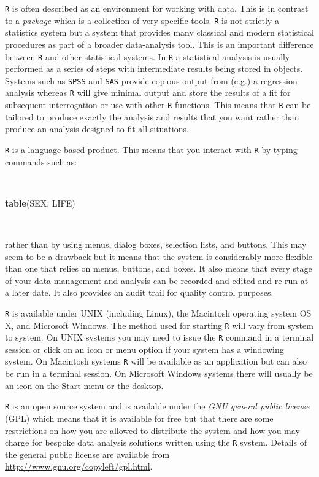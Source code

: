 \documentclass[12pt,a4paper]{book}
\newenvironment{Shaded}{\begin{snugshade}}{\end{snugshade}}
\newcommand{\KeywordTok}[1]{\textcolor[rgb]{0.13,0.29,0.53}{\textbf{#1}}}
\newcommand{\NormalTok}[1]{#1}
\theoremstyle{definition}
\theoremstyle{definition}
\theoremstyle{definition}
\theoremstyle{remark}
\begin{document}
\texttt{R} is often described as an environment for working with data.
This is in contrast to a \emph{package} which is a collection of very
specific tools. \texttt{R} is not strictly a statistics system but a
system that provides many classical and modern statistical procedures as
part of a broader data-analysis tool. This is an important difference
between \texttt{R} and other statistical systems. In \texttt{R} a
statistical analysis is usually performed as a series of steps with
intermediate results being stored in objects. Systems such as
\texttt{SPSS} and \texttt{SAS} provide copious output from (e.g.) a
regression analysis whereas \texttt{R} will give minimal output and
store the results of a fit for subsequent interrogation or use with
other \texttt{R} functions. This means that \texttt{R} can be tailored
to produce exactly the analysis and results that you want rather than
produce an analysis designed to fit all situations.

\texttt{R} is a language based product. This means that you interact
with \texttt{R} by typing commands such as:

~

\begin{Shaded}
\begin{Highlighting}[]
\KeywordTok{table}\NormalTok{(SEX, LIFE)}
\end{Highlighting}
\end{Shaded}

~

rather than by using menus, dialog boxes, selection lists, and buttons.
This may seem to be a drawback but it means that the system is
considerably more flexible than one that relies on menus, buttons, and
boxes. It also means that every stage of your data management and
analysis can be recorded and edited and re-run at a later date. It also
provides an audit trail for quality control purposes.

\texttt{R} is available under UNIX (including Linux), the Macintosh
operating system OS X, and Microsoft Windows. The method used for
starting \texttt{R} will vary from system to system. On UNIX systems you
may need to issue the \texttt{R} command in a terminal session or click
on an icon or menu option if your system has a windowing system. On
Macintosh systems \texttt{R} will be available as an application but can
also be run in a terminal session. On Microsoft Windows systems there
will usually be an icon on the Start menu or the desktop.

\texttt{R} is an open source system and is available under the \emph{GNU
general public license} (GPL) which means that it is available for free
but that there are some restrictions on how you are allowed to
distribute the system and how you may charge for bespoke data analysis
solutions written using the \texttt{R} system. Details of the general
public license are available from
\url{http://www.gnu.org/copyleft/gpl.html}.
\end{document}
